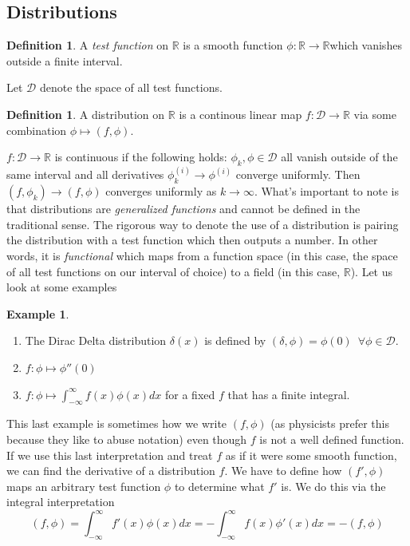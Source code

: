 \documentclass{article}
\newcommand{\R}{\mathbb{R}}
\theoremstyle{definition}
\newtheorem{definition}[theorem]{Definition}
\newtheorem{example}[theorem]{Example}
\begin{document}
\subsection{Distributions}
\begin{definition}
    A \emph{test function} on $\R$ is a smooth function $\phi: \R \to \R$which vanishes outside a finite interval.
\end{definition}
Let $\mathcal{D}$ denote the space of all test functions. 
\begin{definition}
    A distribution on $\R$ is a continous linear map $f:\mathcal{D} \to \R$ via some combination $\phi \mapsto (f,\phi)$.
\end{definition}
$f:\mathcal{D}\to \R$ is continuous if the following holds: $\phi_k, \phi \in \mathcal{D}$ all vanish outside of the same interval and all derivatives $\phi_k^{(i)} \to \phi^{(i)}$ converge uniformly. Then $(f,\phi_k) \to (f,\phi)$ converges uniformly as $k\to \infty$. What's important to note is that distributions are \emph{generalized functions} and cannot be defined in the traditional sense. The rigorous way to denote the use of a distribution is pairing the distribution with a test function which then outputs a number. In other words, it is \emph{functional} which maps from a function space (in this case, the space of all test functions on our interval of choice) to a field (in this case, $\R$). Let us look at some examples 
\begin{example}
    \begin{enumerate}
        \item The Dirac Delta distribution $\delta(x)$ is defined by $(\delta, \phi) = \phi (0) \,\,\, \forall \phi \in \mathcal{D}$.
        \item $f:\phi \mapsto \phi''(0)$
        \item $\displaystyle{f:\phi \mapsto \int^\infty_{-\infty}f(x)\phi(x)dx}$ for a fixed $f$ that has a finite integral.
    \end{enumerate}
\end{example}
This last example is sometimes how we write $(f,\phi)$ (as physicists prefer this because they like to abuse notation) even though $f$ is not a well defined function. If we use this last interpretation and treat $f$ as if it were some smooth function, we can find the derivative of a distribution $f$. We have to define how $(f',\phi)$ maps an arbitrary test function $\phi$ to determine what $f'$ is. We do this via the integral interpretation 
\begin{equation*}
    (f,\phi) = \int^\infty_{-\infty}f'(x)\phi(x)dx = -\int^\infty_{-\infty} f(x) \phi'(x)dx = -(f,\phi)
\end{equation*}
\end{document}
